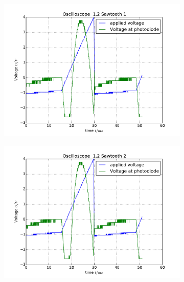 \begin{figure}
    \begin{subfigure}[b]{\picwidth}
        \includegraphics[width=\textwidth]{analysis/figures/12sawtooth1}
        \caption{}
    \end{subfigure}\qquad
    \begin{subfigure}[b]{\picwidth}
        \includegraphics[width=\textwidth]{analysis/figures/12sawtooth2}
        \caption{}
    \end{subfigure}
    \begin{subfigure}[b]{\picwidth}

\end{subfigure}
\end{figure}
